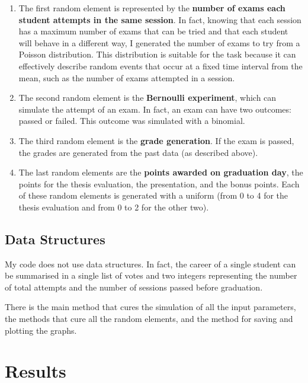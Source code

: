 \documentclass[conference]{IEEEtran}
\begin{document}
{    \begin{enumerate}
        \item The first random element is represented by the \textbf{number of exams each student attempts in the same session}. 
        In fact, knowing that each session has a maximum number of exams that can be tried and that each student will behave in a different way, I generated the number of exams to try from a Poisson distribution. 
        This distribution is suitable for the task because it can effectively describe random events that occur at a fixed time interval from the mean, such as the number of exams attempted in a session.
        
        \item The second random element is the \textbf{Bernoulli experiment}, which can simulate the attempt of an exam.
        In fact, an exam can have two outcomes: passed or failed.
        This outcome was simulated with a binomial. 
        
        \item The third random element is the \textbf{grade generation}. 
        If the exam is passed, the grades are generated from the past data (as described above).

        \item The last random elements are the \textbf{points awarded on graduation day}, the points for the thesis evaluation, the presentation, and the bonus points. Each of these random elements is generated with a uniform (from 0 to 4 for the thesis evaluation and from 0 to 2 for the other two). 
    \end{enumerate}

    \subsection{Data Structures}

    My code does not use data structures.
    In fact, the career of a single student can be summarised in a single list of votes and two integers representing the number of total attempts and the number of sessions passed before graduation.
    
    There is the main method that cures the simulation of all the input parameters, the methods that cure all the random elements, and the method for saving and plotting the graphs. 

\section{Results}

}
\end{document}
